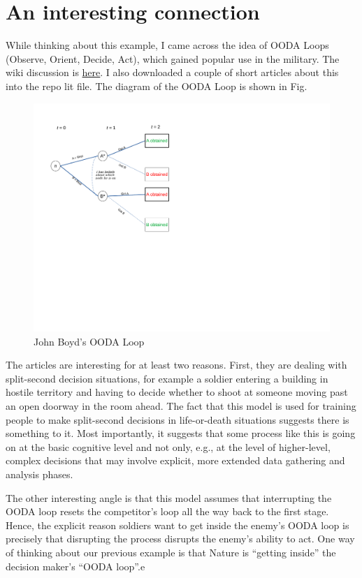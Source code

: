 \documentclass[
11pt,
titlepage,
reqno,
]{article}%
\theoremstyle{definition}
\begin{document}
\section*{An interesting connection}
While thinking about this example, I came across the idea of OODA Loops (Observe, Orient, Decide, Act), which gained popular use in the military. The wiki discussion is \href{https://en.wikipedia.org/wiki/OODA_loop}{here}. I also downloaded a couple of short articles about this into the repo lit file. The diagram of the OODA Loop  is shown in Fig. 

\begin{figure}[h!]
	\centering
	\includegraphics*[page=14,trim = 0in 2in 0in 0in,scale=.65]{Awareness_Diagrams_All}
	\caption{John Boyd's OODA Loop\label{Diag: p-14}}%
\end{figure}

The articles are interesting for at least two reasons. First, they are dealing with split-second decision situations, for example a soldier entering a building in hostile territory and having to decide whether to shoot at someone moving past an open doorway in the room ahead. The fact that this model is used for training people to make split-second decisions in life-or-death situations suggests there is something to it. Most importantly, it suggests that some process like this is going on at the basic cognitive level and not only, e.g., at the level of higher-level, complex decisions that may involve explicit, more extended data gathering and analysis phases. 

The other interesting angle is that this model assumes that interrupting the OODA loop resets the competitor's loop all the way back to the first stage. Hence, the explicit reason soldiers want to get inside the enemy's OODA loop is precisely that disrupting the process disrupts the enemy's ability to act. One way of thinking about our previous example is that Nature is ``getting inside'' the decision maker's ``OODA loop''.e
\end{document}
